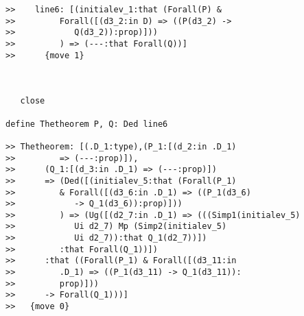 \documentclass{slides}
\begin{document}
\begin{slide}
\begin{verbatim}
>>    line6: [(initialev_1:that (Forall(P) &
>>         Forall([(d3_2:in D) => ((P(d3_2) ->
>>            Q(d3_2)):prop)]))
>>         ) => (---:that Forall(Q))]
>>      {move 1}



   close

define Thetheorem P, Q: Ded line6

>> Thetheorem: [(.D_1:type),(P_1:[(d_2:in .D_1)
>>         => (---:prop)]),
>>      (Q_1:[(d_3:in .D_1) => (---:prop)])
>>      => (Ded([(initialev_5:that (Forall(P_1)
>>         & Forall([(d3_6:in .D_1) => ((P_1(d3_6)
>>            -> Q_1(d3_6)):prop)]))
>>         ) => (Ug([(d2_7:in .D_1) => (((Simp1(initialev_5)
>>            Ui d2_7) Mp (Simp2(initialev_5)
>>            Ui d2_7)):that Q_1(d2_7))])
>>         :that Forall(Q_1))])
>>      :that ((Forall(P_1) & Forall([(d3_11:in
>>         .D_1) => ((P_1(d3_11) -> Q_1(d3_11)):
>>         prop)]))
>>      -> Forall(Q_1)))]
>>   {move 0}


\end{verbatim}

\end{slide}
\end{document}
